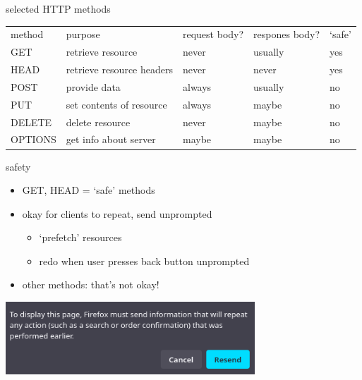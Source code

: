 \begin{frame}{selected HTTP methods}
\small
\begin{tabular}{lllll}
method & purpose & request body? & respones body? & `safe' \\
GET & retrieve resource & never & usually & yes \\
HEAD & retrieve resource headers& never & never & yes \\
POST & provide data & always & usually & no \\
PUT & set contents of resource & always & maybe & no \\
DELETE & delete resource & never & maybe & no \\
OPTIONS & get info about server & maybe & maybe & no \\
\end{tabular}
\end{frame}

\begin{frame}{safety}
    \begin{itemize}
    \item GET, HEAD = `safe' methods
    \item okay for clients to repeat, send unprompted
        \begin{itemize}
        \item `prefetch' resources
        \item redo when user presses back button unprompted
        \end{itemize}
    \item other methods: that's not okay!
    \end{itemize}
\begin{center}
\includegraphics[width=0.7\textwidth]{../http/ff-resend-warning}
\end{center}
\end{frame}

